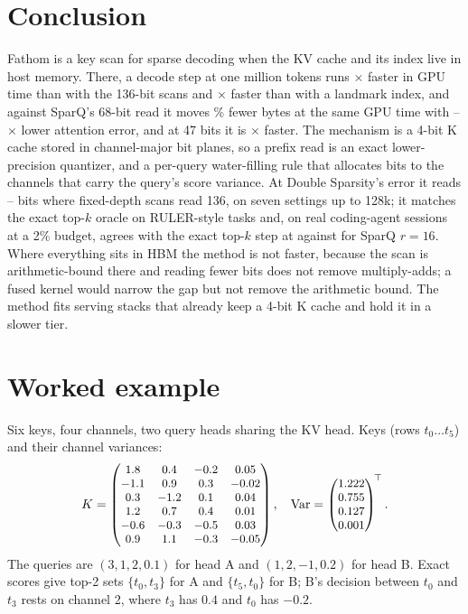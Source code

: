 \documentclass[10pt,twocolumn]{article}
\newcommand{\ours}{Fathom}
\begin{document}
\section{Conclusion}
\ours{} is a key scan for sparse decoding when the KV cache and its index live in host memory. There, a decode step at one million tokens runs \ratioGPUchanr$\times$ faster in GPU time than with the 136-bit scans and \ratioGPUlandmark$\times$ faster than with a landmark index, and against SparQ's 68-bit read it moves \fortyEightBytesFewerPct\% fewer bytes at the same GPU time with \hthRatioMin--\hthRatioMax$\times$ lower attention error, and at 47 bits it is \ratioSparqSixteenOverForty$\times$ faster. The mechanism is a 4-bit K cache stored in channel-major bit planes, so a prefix read is an exact lower-precision quantizer, and a per-query water-filling rule that allocates bits to the channels that carry the query's score variance. At Double Sparsity's error it reads \matchDSmin--\matchDSmax{} bits where fixed-depth scans read 136, on seven settings up to 128k; it matches the exact top-$k$ oracle on RULER-style tasks and, on real coding-agent sessions at a 2\% budget, agrees with the exact top-$k$ step at \agentOsimBigplanesK{} against \agentOsimBigsparq{} for SparQ $r=16$. Where everything sits in HBM the method is not faster, because the scan is arithmetic-bound there and reading fewer bits does not remove multiply-adds; a fused kernel would narrow the gap but not remove the arithmetic bound. The method fits serving stacks that already keep a 4-bit K cache and hold it in a slower tier.

\FloatBarrier




\appendix
\section{Worked example}\label{app:toy}
Six keys, four channels, two query heads sharing the KV head. Keys (rows $t_0\ldots t_5$) and their channel variances:
\begin{equation*}\small
K=\begin{pmatrix}1.8&0.4&-0.2&0.05\\-1.1&0.9&0.3&-0.02\\0.3&-1.2&0.1&0.04\\1.2&0.7&0.4&0.01\\-0.6&-0.3&-0.5&0.03\\0.9&1.1&-0.3&-0.05\end{pmatrix},\quad
\mathrm{Var}=\begin{pmatrix}1.222\\0.755\\0.127\\0.001\end{pmatrix}^{\!\top}.
\end{equation*}
The queries are $(3,1,2,0.1)$ for head A and $(1,2,-1,0.2)$ for head B. Exact scores give top-2 sets $\{t_0,t_3\}$ for A and $\{t_5,t_0\}$ for B; B's decision between $t_0$ and $t_3$ rests on channel 2, where $t_3$ has $0.4$ and $t_0$ has $-0.2$.
\end{document}
